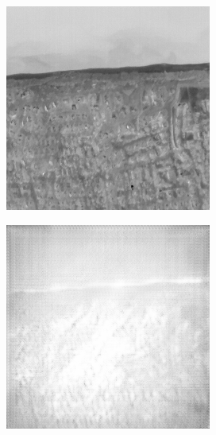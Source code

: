 \documentclass[10pt,twocolumn,letterpaper]{article}
\begin{document}
\begin{figure}[!ht]
  \centering
  \begin{subfigure}[b]{0.19\textwidth}
      \centering
      \includegraphics[width=\textwidth]{../figs/outputs/pan/13.png}
  \end{subfigure}
  \hfill
  \begin{subfigure}[b]{0.19\textwidth}
      \centering
      \includegraphics[width=\textwidth]{../figs/outputs/cycleGan/13.png}

\end{subfigure}
\end{figure}
\end{document}
